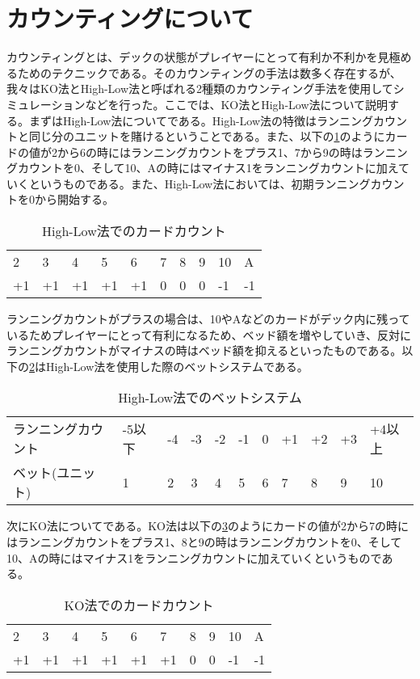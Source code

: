 \section{カウンティングについて}
カウンティングとは、デックの状態がプレイヤーにとって有利か不利かを見極めるためのテクニックである。そのカウンティングの手法は数多く存在するが、我々はKO法とHigh-Low法と呼ばれる2種類のカウンティング手法を使用してシミュレーションなどを行った。ここでは、KO法とHigh-Low法について説明する。まずはHigh-Low法についてである。High-Low法の特徴はランニングカウントと同じ分のユニットを賭けるということである。また、以下の\ref{hlc}のようにカードの値が2から6の時にはランニングカウントをプラス1、7から9の時はランニングカウントを0、そして10、Aの時にはマイナス1をランニングカウントに加えていくというものである。また、High-Low法においては、初期ランニングカウントを0から開始する。
\begin{table}[H]
\begin{tabular}{llllllllll}
2&3&4&5&6&7&8&9&10&A \\
+1&+1&+1&+1&+1&0&0&0&-1&-1 \\
\end{tabular}
\caption{High-Low法でのカードカウント}
\label{hlc}
\end{table}
ランニングカウントがプラスの場合は、10やAなどのカードがデック内に残っているためプレイヤーにとって有利になるため、ベッド額を増やしていき、反対にランニングカウントがマイナスの時はベッド額を抑えるといったものである。以下の\ref{hlb}はHigh-Low法を使用した際のベットシステムである。
\begin{table}[H]
\begin{tabular}{lllllllllll}
ランニングカウント&-5以下&-4&-3&-2&-1&0&+1&+2&+3&+4以上 \\
ベット(ユニット)&1&2&3&4&5&6&7&8&9&10 \\
\end{tabular}
\caption{High-Low法でのベットシステム}
\label{hlb}
\end{table}
次にKO法についてである。KO法は以下の\ref{koc}のようにカードの値が2から7の時にはランニングカウントをプラス1、8と9の時はランニングカウントを0、そして10、Aの時にはマイナス1をランニングカウントに加えていくというものである。
\begin{table}[H]
\begin{tabular}{llllllllll}
2&3&4&5&6&7&8&9&10&A \\
+1&+1&+1&+1&+1&+1&0&0&-1&-1 \\
\end{tabular}
\caption{KO法でのカードカウント}
\label{koc}
\end{table}
